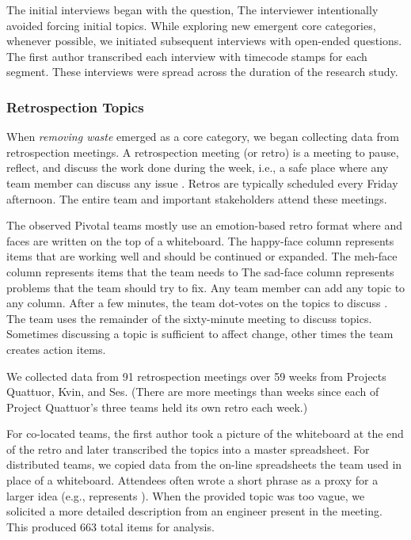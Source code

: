 The initial interviews began with the question,  The interviewer intentionally avoided forcing initial topics. While exploring new emergent core categories, whenever possible, we initiated subsequent interviews with open-ended questions. The first author transcribed each interview with timecode stamps for each segment. These interviews were spread across the duration of the research study. 
\subsubsection{Retrospection Topics}
When \textit{removing waste} emerged as a core category, we began collecting data from retrospection meetings. A retrospection meeting (or retro) is a meeting to pause, reflect, and discuss the work done during the week, i.e., a safe place where any team member can discuss any issue \cite{DerbyAgileRetrospectives}. Retros are typically scheduled every Friday afternoon. The entire team and important stakeholders attend these meetings. 

The observed Pivotal teams mostly use an emotion-based retro format where   and  faces are written on the top of a whiteboard. The happy-face column represents items that are working well and should be continued or expanded. The meh-face column represents items that the team needs to  The sad-face column represents problems that the team should try to fix. Any team member can add any topic to any column. After a few minutes, the team dot-votes on the topics to discuss \cite{DerbyAgileRetrospectives}. The team uses the remainder of the sixty-minute meeting to discuss topics. Sometimes discussing a topic is sufficient to affect change, other times the team creates action items. 

We collected data from 91 retrospection meetings over 59 weeks from Projects Quattuor, Kvin, and Ses. (There are more meetings than weeks since each of Project Quattuor's three teams held its own retro each week.)

For co-located teams, the first author took a picture of the whiteboard at the end of the retro and later transcribed the topics into a master spreadsheet. For distributed teams, we copied data from the on-line spreadsheets the team used in place of a whiteboard. Attendees often wrote a short phrase as a proxy for a larger idea (e.g.,   represents ). When the provided topic was too vague, we solicited a more detailed description from an engineer present in the meeting. This produced 663 total items for analysis. 
